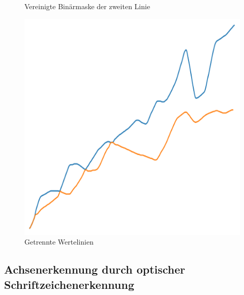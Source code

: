 \begin{figure}[H]
\begin{minipage}{0.315\textwidth}
        \caption{ Vereinigte Binärmaske der zweiten Linie}
        \label{fig:alg_layer2_processed}
    \end{minipage}\hfill %
    \begin{minipage}{0.315\textwidth} %
        \centering
        \includegraphics[width=\linewidth]{Implementation/img/alg_mat.png}
        \caption{ Getrennte Wertelinien}
        \label{fig:alg_mat}
    \end{minipage}
\end{figure}

\subsection{Achsenerkennung durch optischer Schriftzeichenerkennung}

